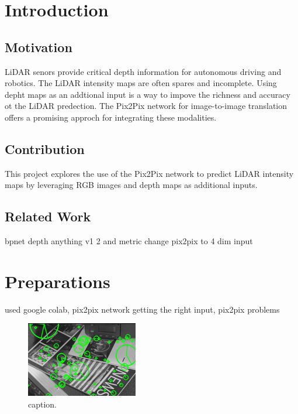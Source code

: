 \chapter{Introduction}
\label{chap:intro}

\section{Motivation}
\label{sect:motivation}
LiDAR senors provide critical depth information for autonomous driving and robotics. The LiDAR intensity maps are often spares and incomplete. Using depht maps as an addtional input is a way to impove the richness and accuracy ot the LiDAR predection. The Pix2Pix network for image-to-image translation offers a promising approch for integrating these modalities. 
\section{Contribution}
This project explores the use of the Pix2Pix network to predict LiDAR intensity maps by leveraging RGB images and depth maps as additional inputs.
\section{Related Work}
bpnet depth anything v1 2 and metric change pix2pix to 4 dim input
\chapter{Preparations}
used google colab, pix2pix network getting the right input, pix2pix problems
\begin{figure}[!ht]
	\centering
	\includegraphics[width=0.9\linewidth]{image.jpg}
	\caption{caption.}
	\label{img:example}
\end{figure}
